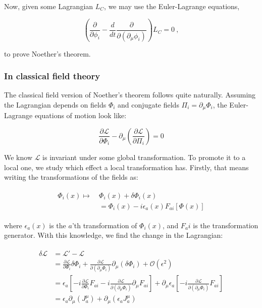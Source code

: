 \documentclass[10pt]{report}
\begin{document}
	Now, given some Lagrangian $L_C$, we may use the Euler-Lagrange equations,
	
	\begin{equation}
		\left(\frac{\partial}{\partial \phi_i} - \frac{d}{dt}\frac{\partial}{\partial \left(\partial_\mu \phi_i\right)}\right)L_C = 0\:,
	\end{equation}
	
	to prove Noether's theorem.
	
	\subsubsection{In classical field theory}
	The classical field version of Noether's theorem follows quite naturally. Assuming the Lagrangian depends on fields $\Phi_i$ and conjugate fields $\Pi_i=\partial_\mu\Phi_i$, the Euler-Lagrange equations of motion look like:
	
	\begin{equation}
		\frac{\partial\mathcal{L}}{\partial\Phi_i} - \partial_\mu\left(\frac{\partial\mathcal{L}}{\partial\Pi_i}\right) = 0
		\label{ChPtTh | eq | euler-lagrange for fields}
	\end{equation}
	
	We know $\mathcal{L}$ is invariant under some global transformation. To promote it to a local one, we study which effect a local transformation has. Firstly, that means writing the transformations of the fields as:
	
	\begin{align}
		\begin{split}
			\Phi_i(x) \mapsto \:& \Phi_i(x) + \delta\Phi_i(x) \\
			&= \Phi_i(x) - i\epsilon_a(x)F_{ai}[\Phi(x)]
		\end{split}
	\end{align}
	
	where $\epsilon_a(x)$ is the $a$'th transformation of $\Phi_i(x)$, and $F_ai$ is the transformation generator. With this knowledge, we find the change in the Lagrangian:
	
	\begin{align}
		\begin{split}
			\delta\mathcal{L} &= \mathcal{L}' - \mathcal{L}\\
			&= \frac{\partial\mathcal{L}}{\partial\Phi_i}\delta\Phi_i + \frac{\partial\mathcal{L}}{\partial(\partial_\mu\Phi_i)}\partial_\mu(\delta\Phi_i) + \mathcal{O}(\epsilon^2) \\
			&= \epsilon_a\left[ -i\frac{\partial\mathcal{L}}{\partial\Phi_i}F_{ai} - i\frac{\partial\mathcal{L}}{\partial(\partial_\mu\Phi_i)}\partial_\mu F_{ai} \right] + \partial_\mu\epsilon_a\left[ -i\frac{\partial\mathcal{L}}{\partial(\partial_\mu\Phi_i)}F_{ai} \right] \\
			&= \epsilon_a\partial_\mu( J_a^\mu) + \partial_\mu( \epsilon_aJ_a^\mu)
		\end{split}
	\end{align}
	
\end{document}
